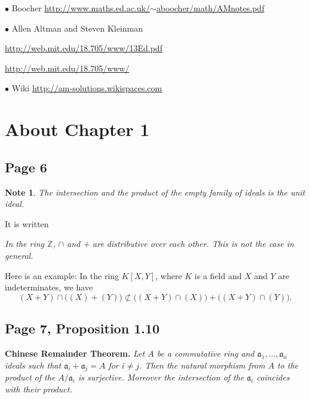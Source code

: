 \documentclass[parskip=half,fontsize=12pt]{scrartcl}%
\newcommand{\mf}{\mathfrak}
\newcommand{\aaa}{\mf a}
\newcommand{\bu}{\bullet}
\newtheorem{note}[thm]{Note}
\begin{document}
$\bu$ Boocher \href{http://www.maths.ed.ac.uk/~aboocher/math/AMnotes.pdf}{\small http://www.maths.ed.ac.uk/$\sim$aboocher/math/AMnotes.pdf}

$\bu$ Allen Altman and Steven Kleinman %

\href{http://web.mit.edu/18.705/www/13Ed.pdf}{http://web.mit.edu/18.705/www/13Ed.pdf}

\href{http://web.mit.edu/18.705/www/}{http://web.mit.edu/18.705/www/}

$\bu$ Wiki \href{http://am-solutions.wikispaces.com}{http://am-solutions.wikispaces.com}

\section{About Chapter 1}

\subsection{Page 6}%

\begin{note}\label{ef}
The intersection and the product of the empty family of ideals is the unit ideal.
\end{note}

It is written

\emph{In the ring $\mathbb Z$, $\cap$ and + are distributive over each other. This is not the case in general.}

Here is an example: In the ring $K[X,Y]$, where $K$ is a field and $X$ and $Y$ are indeterminates, we have 
$$
(X+Y)\cap\Big((X)+(Y)\Big)\not\subset\Big((X+Y)\cap (X)\Big)+\Big((X+Y)\cap (Y)\Big).
$$

\subsection{Page 7, Proposition 1.10}%

\textbf{Chinese Remainder Theorem.} \emph{Let $A$ be a commutative ring and $\aaa_1,\dots,\aaa_n$ ideals such that $\aaa_i+\aaa_j=A$ for $i\not=j$. Then the natural morphism from $A$ to the product of the $A/\aaa_i$ is surjective. Moreover the intersection of the $\aaa_i$ coincides with their product.}
\end{document}
